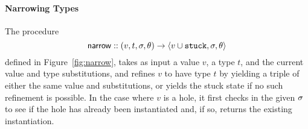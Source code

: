 \paragraph{Narrowing Types} The procedure %
$$
\mathsf{narrow} :: (v, t, \sigma, \theta) \rightarrow \langle v \cup \mathtt{stuck}, \sigma, \theta \rangle
$$
defined in Figure~\ref{fig:narrow}, takes as input a value $v$, a type
$t$, and the current value and type substitutions, and refines $v$ to
have type $t$ by yielding a triple of either the same value and
substitutions, or yields the stuck state if no such refinement is
possible. In the case where $v$ is a hole, it first checks in the given
$\sigma$ to see if the hole has already been instantiated and, if so,
returns the existing instantiation.
%
